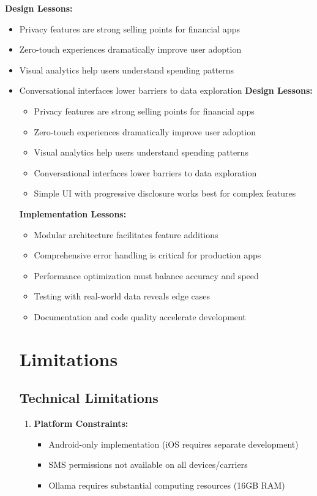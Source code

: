 \documentclass[11pt,a4paper]{report}
\begin{document}
\textbf{Design Lessons:}
\begin{itemize}
    \item Privacy features are strong selling points for financial apps
    \item Zero-touch experiences dramatically improve user adoption
    \item Visual analytics help users understand spending patterns
    \item Conversational interfaces lower barriers to data exploration
\textbf{Design Lessons:}
\begin{itemize}
    \item Privacy features are strong selling points for financial apps
    \item Zero-touch experiences dramatically improve user adoption
    \item Visual analytics help users understand spending patterns
    \item Conversational interfaces lower barriers to data exploration
    \item Simple UI with progressive disclosure works best for complex features
\end{itemize}

\textbf{Implementation Lessons:}
\begin{itemize}
    \item Modular architecture facilitates feature additions
    \item Comprehensive error handling is critical for production apps
    \item Performance optimization must balance accuracy and speed
    \item Testing with real-world data reveals edge cases
    \item Documentation and code quality accelerate development
\end{itemize}

\section{Limitations}

\subsection{Technical Limitations}

\begin{enumerate}
    \item \textbf{Platform Constraints:}
    \begin{itemize}
        \item Android-only implementation (iOS requires separate development)
        \item SMS permissions not available on all devices/carriers
        \item Ollama requires substantial computing resources (16GB RAM)
    \end{itemize}
    

\end{enumerate}
\end{itemize}
\end{document}

